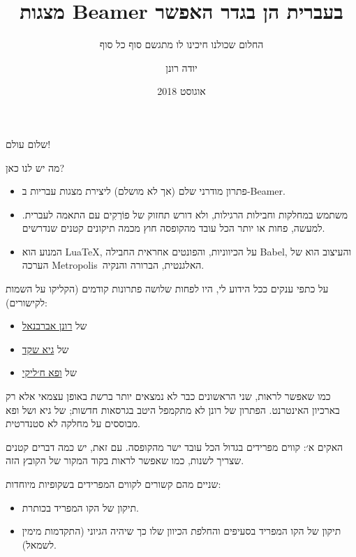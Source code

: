 \documentclass{beamer}
\author{
	\texorpdfstring{
		יודה רונן
		\quad \smallurl{<https://me.digitalwords.net/>}}{Yuda Ronen}}
\begin{document}
	\title{מצגות Beamer בעברית הן בגדר האפשר}
	\subtitle{החלום שכולנו חיכינו לו מתגשם סוף כל סוף}
	
	\date{אוגוסט 2018}
	\frame{\titlepage}
	
	\begin{frame}{שלום עולם!}
		
		מה יש לנו כאן?
		
		\begin{itemize}
			\item פתרון מודרני שלם (אך לא מושלם) ליצירת מצגות עבריות ב-Beamer.
			\item משתמש במחלקות וחבילות הרגילות, ולא דורש תחזוק של פוֹרְקִים עם התאמה לעברית. למעשה, פחות או יותר הכל עובד מהקופסה חוץ מכמה תיקונים קטנים שנדרשים.
			\item המנוע הוא Lua\TeX, על הכיווניות, והפונטים אחראית החבילה Babel, והעיצוב הוא של הערכה Metropolis האלגנטית, הברורה והנקיה.
		\end{itemize}
	\end{frame}
	
	
	\begin{frame}{על כתפי ענקים}
		ככל הידוע לי, היו לפחות שלושה פתרונות קודמים (הקליקו על השמות לקישורים):
		\begin{itemize}
			\item של \href{https://web.archive.org/web/20111206041733/http://www.technion.ac.il/~ronen/latex/beamer_hebrew.html}{רונן אברבנאל}
			\item של \href{https://web.archive.org/web/20150327024158/http://technion.ac.il/~gai/beamer/index.html}{גיא שקד}
			\item של \href{https://tug.org/pipermail/xetex/2009-July/013721.html}{ופא ח׳ליקי}
		\end{itemize}
		
		כמו שאפשר לראות, שני הראשונים כבר לא נמצאים יותר ברשת באופן עצמאי אלא רק בארכיון האינטרנט.
		הפתרון של רונן לא מתקמפל היטב בגרסאות חדשות;
		של גיא ושל ופא מבוססים על מחלקה לא סטנדרטית.
	\end{frame}
	
	
	\begin{frame}{האקים א׳: קווים מפרידים}
		בגדול הכל עובד ישר מהקופסה. עם זאת, יש כמה דברים קטנים שצריך לשנות, כמו שאפשר לראות בקוד המקור של הקובץ הזה.
		
		שניים מהם קשורים לקווים המפרידים בשקופיות מיוחדות:
		
		\begin{itemize}
			\item תיקון של הקו המפריד בכותרת.
			\item תיקון של הקו המפריד בסעיפים והחלפת הכיוון שלו כך שיהיה הגיוני (התקדמות מימין לשמאל).
		\end{itemize}
	\end{frame}
	
\end{document}
